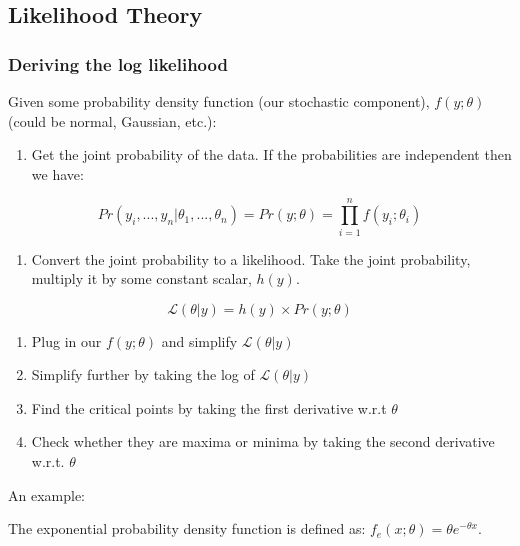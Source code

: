 \documentclass[
]{article}
\providecommand{\tightlist}{%
  \setlength{\itemsep}{0pt}\setlength{\parskip}{0pt}}
\begin{document}
\hypertarget{likelihood-theory}{%
\subsection{Likelihood Theory}\label{likelihood-theory}}

\hypertarget{deriving-the-log-likelihood}{%
\subsubsection{Deriving the log
likelihood}\label{deriving-the-log-likelihood}}

Given some probability density function (our stochastic component),
\(f(y;\theta)\) (could be normal, Gaussian, etc.):

\begin{enumerate}
\def\labelenumi{\arabic{enumi}.}
\tightlist
\item
  Get the joint probability of the data. If the probabilities are
  independent then we have:
\end{enumerate}

\[Pr(y_i,. . ., y_n|\theta_1, . . ., \theta_n)=Pr(y;\theta)=\prod_{i=1}^nf(y_i;\theta_i)\]

\begin{enumerate}
\def\labelenumi{\arabic{enumi}.}
\setcounter{enumi}{1}
\tightlist
\item
  Convert the joint probability to a likelihood. Take the joint
  probability, multiply it by some constant scalar, \(h(y)\).
\end{enumerate}

\[\mathcal{L}(\theta|y)=h(y)\times Pr(y;\theta)\]

\begin{enumerate}
\def\labelenumi{\arabic{enumi}.}
\setcounter{enumi}{2}
\item
  Plug in our \(f(y;\theta)\) and simplify \(\mathcal{L}(\theta|y)\)
\item
  Simplify further by taking the log of \(\mathcal{L}(\theta|y)\)
\item
  Find the critical points by taking the first derivative w.r.t
  \(\theta\)
\item
  Check whether they are maxima or minima by taking the second
  derivative w.r.t. \(\theta\)
\end{enumerate}

An example:

The exponential probability density function is defined as:
\(f_e(x;\theta)=\theta e^{-\theta x}\).
\end{document}
